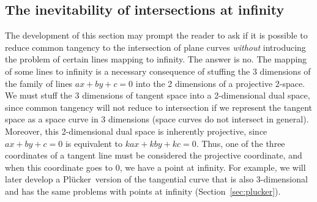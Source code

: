 \documentclass[10pt,twocolumn]{article}
\newcommand{\plucker}{Pl\"{u}cker\ }
\begin{document}
\subsection{The inevitability of intersections at infinity}

The development of this section may prompt the reader to ask if it is
possible to reduce common tangency to the intersection of plane curves
{\em without} introducing the problem of certain lines mapping to infinity.
The answer is no.
The mapping of some lines to infinity is a necessary consequence of 
stuffing the 3 dimensions of the family of lines $ax+by+c=0$
into the 2 dimensions of a projective 2-space.
We must stuff the 3 dimensions of tangent space into a 2-dimensional
dual space, since common tangency will not reduce to intersection if we represent
the tangent space as a space curve in 3 dimensions
(space curves do not intersect in general).
Moreover, this 2-dimensional dual space is inherently projective,
since $ax+by+c=0$ is equivalent to $kax+kby+kc=0$.
Thus, one of the three coordinates of a tangent line must be considered the 
projective coordinate, and
when this coordinate goes to 0, we have a point at infinity.
For example, we will later develop a \plucker version of the 
tangential curve that is also 3-dimensional
and has the same problems with points at infinity (Section~\ref{sec:plucker}).

\end{document}
